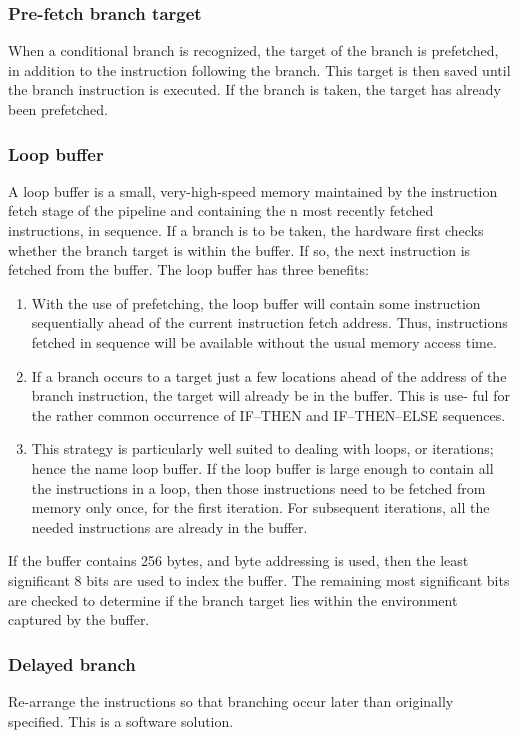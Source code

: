 \subsubsection{Pre-fetch branch target}
When a conditional branch is recognized, the target of the branch is prefetched, in addition to the instruction following the branch. This target is then saved until the branch instruction is executed. If the branch is taken, the target has already been prefetched.

\subsubsection{Loop buffer}
A loop buffer is a small, very-high-speed memory maintained by the instruction fetch stage of the pipeline and containing the n most recently fetched instructions, in sequence. If a branch is to be taken, the hardware first checks whether the branch target is within the buffer. If so, the next instruction is fetched from the buffer. The loop buffer has three benefits:
\begin{enumerate}
\item With the use of prefetching, the loop buffer will contain some instruction sequentially ahead of the current instruction fetch address. Thus, instructions fetched in sequence will be available without the usual memory access time. 
\item If a branch occurs to a target just a few locations ahead of the address of the branch instruction, the target will already be in the buffer. This is use- ful for the rather common occurrence of IF–THEN and IF–THEN–ELSE sequences.
\item This strategy is particularly well suited to dealing with loops, or iterations; hence the name loop buffer. If the loop buffer is large enough to contain all the instructions in a loop, then those instructions need to be fetched from memory only once, for the first iteration. For subsequent iterations, all the needed instructions are already in the buffer.
\end{enumerate}

If the buffer contains 256 bytes, and byte addressing is used, then the least significant 8 bits are used to index the buffer. The remaining most significant bits are checked to determine if the branch target lies within the environment captured by the buffer.

\subsubsection{Delayed branch}
Re-arrange the instructions so that branching occur later than originally specified. This is a software solution.

